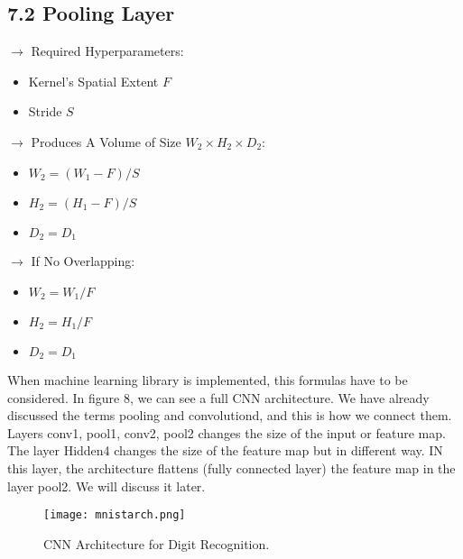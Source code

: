 \documentclass[11pt]{article}
\begin{document}
\subsection{7.2 Pooling Layer}$\rightarrow$ Required Hyperparameters:
\begin{itemize}
	\item Kernel's Spatial Extent $F$
	\item Stride $S$

\end{itemize}
$\rightarrow$ Produces A Volume of Size $W_2 \times H_2 \times D_2$:
\begin{itemize}
	\item $W_2 = (W_1 - F)/S$
	\item $H_2 = (H_1 - F)/S$
	\item $D_2 = D_1$
\end{itemize}
$\rightarrow$ If No Overlapping:
\begin{itemize}
	\item $W_2 = W_1/F$
	\item $H_2 = H_1/F$
	\item $D_2 = D_1$
\end{itemize}
When machine learning library is implemented, this formulas have to be considered. In figure 8, we can see a full CNN architecture. We have already discussed the terms pooling and convolutiond, and this is how we connect them. Layers conv1, pool1, conv2, pool2 changes the size of the input or feature map. The layer Hidden4 changes the size of the feature map but in different way. IN this layer, the architecture flattens (fully connected layer) the feature map in the layer pool2. We will discuss it later.
\begin{figure}[H]
\centering
\texttt{[image: mnistarch.png]}
\caption{CNN Architecture for Digit Recognition.}
\label{fig:figure3}
\end{figure}
\end{document}
